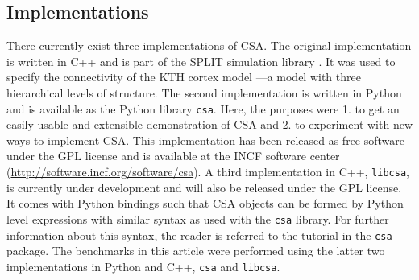 \documentclass{frontiersSCNS} %
\begin{document}
\subsection{Implementations}\label{sec:impl}

There currently exist three implementations of CSA.  The original
implementation is written in C++ and is part of the SPLIT simulation
library \citep{djurfeldt05}.  It was used to specify the connectivity
of the KTH cortex model \citep{djurfeldt08}---a model with three
hierarchical levels of structure.  The second implementation is
written in Python and is available as the Python library \verb|csa|.
Here, the purposes were 1. to get an easily usable and extensible
demonstration of CSA and 2. to experiment with new ways to implement
CSA. This implementation has been released as free software under the
GPL license and is available at the INCF software center
(\url{http://software.incf.org/software/csa}). A third implementation
in C++, \verb|libcsa|, is currently under development and will also be
released under the GPL license. It comes with Python bindings such
that CSA objects can be formed by Python level expressions with
similar syntax as used with the \verb|csa| library. For further
information about this syntax, the reader is referred to the tutorial
in the \verb|csa| package. The benchmarks in this article were
performed using the latter two implementations in Python and C++,
\verb|csa| and \verb|libcsa|.


\end{document}
